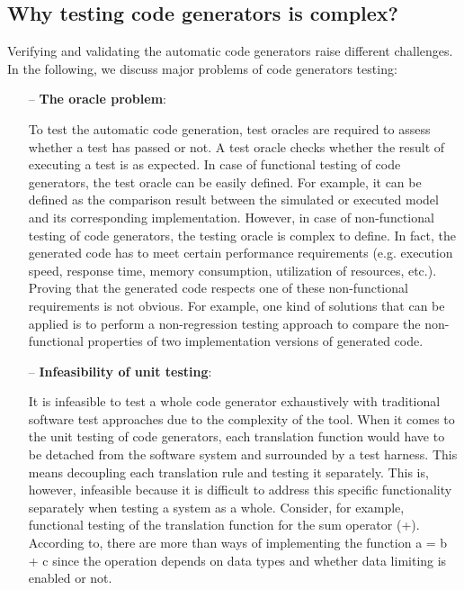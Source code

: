 \subsection{Why testing code generators is complex?}
\label{sec:Why testing code generators is complex?}
Verifying and validating the automatic code generators raise different challenges.
In the following, we discuss major problems of code generators testing:
\begin{itemize}
	\item[--] \textbf{The oracle problem}: 
	
	To test the automatic code generation, test oracles are required to assess whether a test has passed or not. A test
	oracle checks whether the result of executing a test is as expected.
	In case of functional testing of code generators, the test oracle can be easily defined. For example, it can be defined as the comparison result between the simulated or executed model and its corresponding implementation. 
	However, in case of non-functional testing of code generators, the testing oracle is complex to define. In fact, the generated code has to meet certain performance requirements (e.g. execution speed, response time, memory consumption, utilization of resources, etc.). Proving that the generated code respects one of these non-functional requirements is not obvious. For example, one kind of solutions that can be applied is to perform a non-regression testing approach to compare the non-functional properties of two implementation versions of generated code.
	
	\item[--] \textbf{Infeasibility of unit testing}:
	 
	It is infeasible to test a whole code generator exhaustively with traditional software test approaches due to the complexity of the tool. When it comes to the unit testing of code generators, each translation function would have to be detached from the software system and surrounded by a test harness. This means decoupling each translation rule and testing it separately. This is, however, infeasible because it is difficult to address this specific functionality separately when testing a system as a whole. 
	Consider, for example, functional testing of the translation function for the sum operator (+). According to\cite{burnard2004verifying}, there are more than  ways of implementing the function a = b + c since the operation depends on data types and whether data limiting is enabled or not.
		

\end{itemize}
